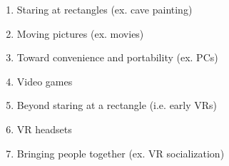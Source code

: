     \begin{enumerate}
      \item Staring at rectangles (ex. cave painting)
      \item Moving pictures (ex. movies)
      \item Toward convenience and portability (ex. PCs)
      \item Video games
      \item Beyond staring at a rectangle (i.e. early VRs)
      \item VR headsets
      \item Bringing people together (ex. VR socialization)
    \end{enumerate}

